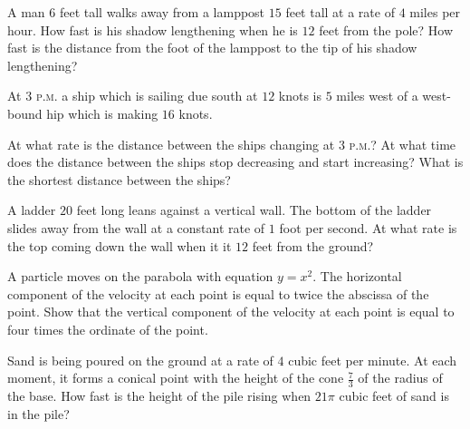 \begin{exercises}
A man $6$ feet tall walks away from a lamppost $15$ feet tall
at a rate of $4$ miles per hour.  How fast is his shadow lengthening
when he is $12$ feet from the pole?  How fast is the distance from
the foot of the lamppost to the tip of his shadow lengthening?

At $3$ \textsc{p.m.} a ship which is sailing due south at $12$ knots
is $5$ miles west of a west-bound hip which is making $16$ knots.
\begin{exenum}
\sx
At what rate is the distance between the ships changing at $3$
\textsc{p.m.}?
\sx
At what time does the distance between the ships stop decreasing
and start increasing?
\sx
What is the shortest distance between the ships?
\end{exenum}

A ladder $20$ feet long leans against a vertical wall.
The bottom of the ladder slides away from the wall at a constant
rate of $1$ foot per second.  At what rate is the top coming
down the wall when it it $12$ feet from the ground?

A particle moves on the parabola with equation $y = x^2$.
The horizontal component of the velocity at each point is equal
to twice the abscissa of the point.  Show that the vertical component
of the velocity at each point is equal to
four times the ordinate of the point.

Sand is being poured on the ground at a rate of $4$ cubic feet
per minute.  At each moment, it forms a conical point with the
height of the cone $\frac73$ of the radius of the base.
How fast is the height of the pile rising when $21\pi$ cubic feet
of sand is in the pile?

\end{exercises}
